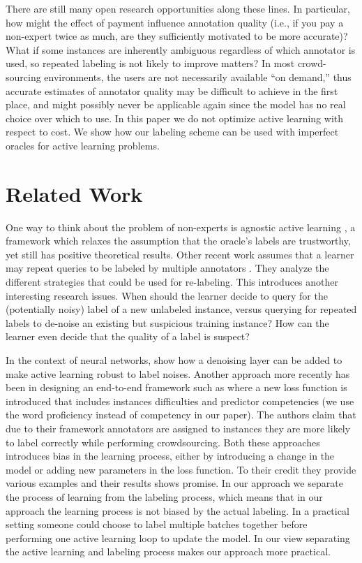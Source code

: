 \documentclass[twoside,11pt]{article}
\begin{document}
There are still many open research opportunities along these lines. In particular, how might the effect of payment influence annotation quality (i.e., if you pay a non-expert twice as much, are they sufficiently motivated to be more accurate)?  What if some instances are inherently ambiguous regardless of which annotator is used, so repeated labeling is not likely to improve matters?  In most crowd-sourcing environments,  the users are not necessarily available  “on  demand,”  thus  accurate  estimates  of  annotator  quality  may  be  difficult  to achieve  in  the  first  place,  and  might  possibly  never  be  applicable  again  since  the  model has no real choice over which to use.  In this paper we do not optimize active learning with respect to cost. We show how our labeling scheme can be used with imperfect oracles for active learning problems.

\section{Related Work}

One way to think about the problem of non-experts is agnostic active learning \cite{balcan2009agnostic}, a framework which relaxes the assumption that the oracle's labels are trustworthy, yet still has positive theoretical results. Other  recent  work  assumes  that  a  learner  may  repeat  queries  to  be  labeled  by  multiple annotators \cite{sheng2008get}. They analyze the different strategies that could be used for re-labeling. This introduces another interesting research issues.  When should the learner decide to query for the (potentially noisy) label of a new unlabeled instance, versus querying for repeated labels to de-noise an existing but suspicious training instance?  How can the learner even decide that the quality of a label is suspect?

In the context of neural networks, \cite{gupta2019learning} show how a denoising layer can be added to make active learning robust to label noises. Another approach more recently has been in designing an end-to-end framework such as \cite{platanios2020learning} where a new loss function is introduced that includes instances difficulties and predictor competencies (we use the word proficiency instead of competency in our paper). The authors claim that due to their framework annotators are assigned to instances they are more likely to label correctly  while performing crowdsourcing. Both these approaches introduces bias in the learning process, either by introducing a change in the model or adding new parameters in the loss function. To their credit they provide various examples and their results shows promise. In our approach we separate the process of learning from the labeling process, which means that in our approach the learning process is not biased by the actual labeling. In a practical setting someone could choose to label multiple batches together before performing one active learning loop to update the model. In our view separating the active learning and labeling process makes our approach more practical.
\end{document}
